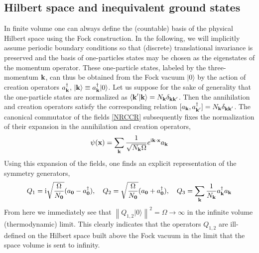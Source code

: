 \documentclass[final,2p,times,12pt,sort&compress]{elsarticle}
\newcommand\vek[1]{{\boldsymbol{\bf #1}}}   %
\newcommand\skal[2]{\vek{#1}\cdot\vek{#2}}  %
\newcommand\ket[1]{\vert#1\rangle}          %
\newcommand\braket[2]{\langle#1\vert#2\rangle} %
\newcommand\he[1]{#1^{\dagger}}             %
\newcommand\imag{\mathrm i}                 %
\newcommand\nor[1]{\left\|#1\right\|}       %
\begin{document}
\subsection{Hilbert space and inequivalent ground states}
In finite volume one can always define the (countable) basis of the
physical Hilbert space using the Fock construction. In the following, we will
implicitly assume periodic boundary conditions so that (discrete) translational
invariance is preserved and the basis of one-particles states may be chosen as
the eigenstates of the momentum operator. These one-particle states, labeled by
the three-momentum $\vek k$, can thus be obtained from the Fock vacuum $\ket0$
by the action of creation operators $\he a_{\vek k}$, $\ket{\vek k}\equiv\he
a_{\vek k}\ket0$. Let us suppose for the sake of generality that the
one-particle states are normalized as $\braket{\vek k'}{\vek k}=N_{\vek
k}\delta_{\vek k\vek k'}$. Then the annihilation and creation operators satisfy
the corresponding relation $[a_{\vek k},\he a_{\vek k'}]=N_{\vek k}\delta_{\vek
k\vek k'}$. The canonical commutator of the fields \eqref{NRCCR} subsequently
fixes the normalization of their expansion in the annihilation and creation
operators,
\begin{equation}
\psi(\vek x)=\sum_{\vek k}\frac{1}{\sqrt{N_{\vek k}\Omega}}
e^{\imag\skal kx}a_{\vek k}
\end{equation}
Using this expansion of the fields, one finds an explicit representation of the
symmetry generators,
\begin{equation}
Q_1=\imag\sqrt{\frac{\Omega}{N_{\vek 0}}}(a_{\vek 0}-\he a_{\vek 0}),\quad
Q_2=\sqrt{\frac{\Omega}{N_{\vek 0}}}(a_{\vek 0}+\he a_{\vek 0}),\quad
Q_3=\sum_{\vek k}\frac1{N_{\vek k}}\he a_{\vek k}a_{\vek k}
\label{NRgenerators}
\end{equation}
From here we immediately see that $\nor{Q_{1,2}\ket0}^2=\Omega\to\infty$ in
the infinite volume (thermodynamic) limit. This clearly indicates that the
operators $Q_{1,2}$ are ill-defined on the Hilbert space built above the Fock
vacuum in the limit that the space volume is sent to infinity.
\end{document}
